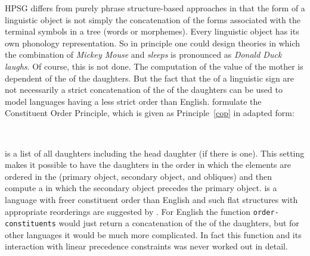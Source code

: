\documentclass[output=paper]{langsci/langscibook}
\begin{document}
HPSG differs from purely phrase structure-based approaches in that the form of a linguistic object
is not simply the concatenation of the forms associated with the terminal symbols in a tree (words or
morphemes). Every linguistic object has its own phonology representation. So in principle one could
design theories in which the combination of \emph{Mickey Mouse} and \emph{sleeps} is pronounced as
\emph{Donald Duck laughs}. Of course, this is not done. The computation of the \phon value of the
mother is dependent of the \phonvs of the daughters. But the fact that the \phonvs of a linguistic
sign are not necessarily a strict concatenation of the \phonvs of the daughters can be used to model
languages having a less strict order than English. \citet[]{ps} formulate the Constituent
Order Principle, which is given as Principle~\ref{cop} in adapted form:
\begin{principle-break}
\label{cop}
~\\[-3mm]
 \impl {}
\end{principle-break}
\dtrs is a list of all daughters including the head daughter (if there is one). This setting makes
it possible to have the daughters in the order in which the elements are ordered in the \compsl
(primary object, secondary object, and obliques) and then compute a \phonv in which the secondary
object precedes the primary object.  is a language with freer constituent order than
English and such flat structures with appropriate reorderings are suggested by \citet{AG2000a}. For
English the function \texttt{order-constituents} would just return a concatenation of the \phonvs of the
daughters, but for other languages it would be much more complicated. In fact this function and its
interaction with linear precedence constraints was never worked out in detail.
\end{document}

